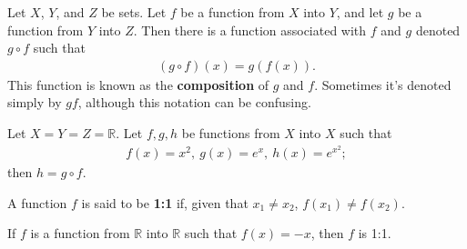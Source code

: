 \documentclass[12pt]{article}
\begin{document}
\begin{defn}
  Let $X$, $Y$, and $Z$ be sets. Let $f$ be a function from $X$ into $Y$, and let $g$
  be a function from $Y$ into $Z$. Then there is a function associated with $f$ and
  $g$ denoted $g \circ f$ such that
  \begin{align*}
    (g \circ f)(x) = g(f(x)).
  \end{align*}
  This function is known as the \textbf{composition} of $g$ and $f$. Sometimes it's
  denoted simply by $gf$, although this notation can be confusing.
\end{defn}

\begin{exm}
  Let $X = Y = Z = \mathbb{R}$. Let $f,g,h$ be functions from $X$ into $X$ such that
  \begin{align*}
    f(x) = x^2,\ g(x) = e^x,\ h(x) = e^{x^2};
  \end{align*}
  then $h = g \circ f$.
\end{exm}

\begin{defn}
  A function $f$ is said to be \textbf{1:1} if, given that $x_1 \neq x_2$, $f(x_1)
  \neq f(x_2)$.
\end{defn}

\begin{exm}
  If $f$ is a function from $\mathbb{R}$ into $\mathbb{R}$ such that $f(x) = -x$,
  then $f$ is 1:1.
\end{exm}
\end{document}
